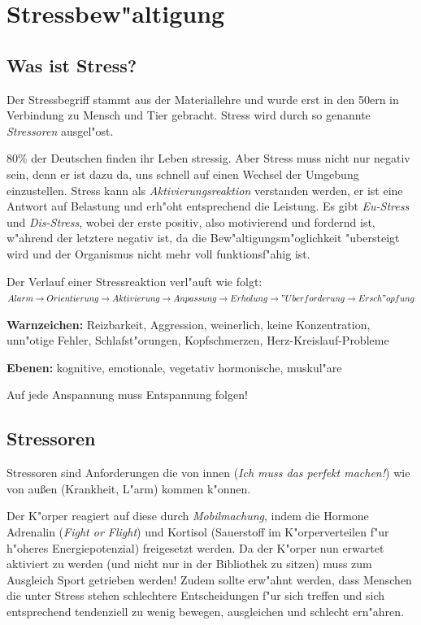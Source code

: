 \documentclass[]{scrartcl}
\begin{document}
\section{Stressbew"altigung}

\subsection{Was ist Stress?}

Der Stressbegriff stammt aus der Materiallehre und wurde erst in den 50ern in Verbindung zu Mensch und Tier gebracht. Stress wird durch so genannte \emph{Stressoren} ausgel"ost.

80\% der Deutschen finden ihr Leben stressig. Aber Stress muss nicht nur negativ sein, denn er ist dazu da, uns schnell auf einen Wechsel der Umgebung einzustellen. Stress kann als \emph{Aktivierungsreaktion} verstanden werden, er ist eine Antwort auf Belastung und erh"oht entsprechend die Leistung. Es gibt \emph{Eu-Stress} und \emph{Dis-Stress}, wobei der erste positiv, also motivierend und fordernd ist, w"ahrend der letztere negativ ist, da die Bew"altigungsm"oglichkeit "ubersteigt wird und der Organismus nicht mehr voll funktionsf"ahig ist.

Der Verlauf einer Stressreaktion verl"auft wie folgt: $Alarm \rightarrow Orientierung \rightarrow Aktivierung \rightarrow Anpassung \rightarrow Erholung \rightarrow "Uberforderung \rightarrow Ersch"opfung $


\textbf{Warnzeichen: } Reizbarkeit, Aggression, weinerlich, keine Konzentration, unn"otige Fehler, Schlafst"orungen, Kopfschmerzen, Herz-Kreislauf-Probleme 

\textbf{Ebenen:      } kognitive, emotionale, vegetativ hormonische, muskul"are

Auf jede Anspannung muss Entspannung folgen!


\subsection{Stressoren}

Stressoren sind Anforderungen die von innen (\emph{Ich muss das perfekt machen!}) wie von au\ss en (Krankheit, L"arm) kommen k"onnen. 

Der K"orper reagiert auf diese durch \emph{Mobilmachung}, indem die Hormone Adrenalin (\emph{Fight or Flight}) und Kortisol (Sauerstoff im K"orperverteilen f"ur h"oheres Energiepotenzial) freigesetzt werden. Da der K"orper nun erwartet aktiviert zu werden (und nicht nur in der Bibliothek zu sitzen) muss zum Ausgleich Sport getrieben werden! Zudem sollte erw"ahnt werden, dass Menschen die unter Stress stehen schlechtere Entscheidungen f"ur sich treffen und sich entsprechend tendenziell zu wenig bewegen, ausgleichen und schlecht ern"ahren. 
\end{document}
